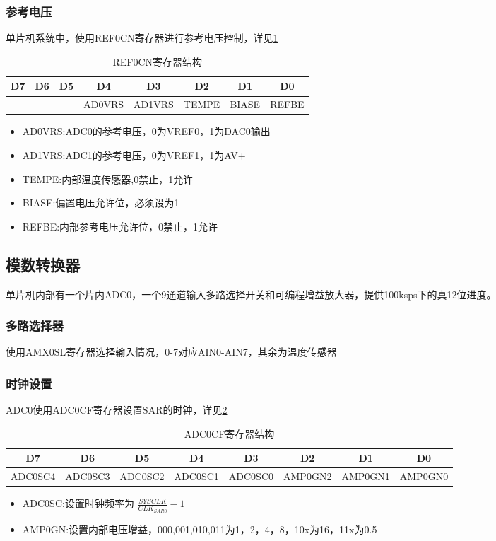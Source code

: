 \documentclass{article}
\begin{document}
\begin{CJK}{UTF8}{gkai}
\subsubsection{参考电压}
单片机系统中，使用REF0CN寄存器进行参考电压控制，详见\ref{table_REF0CN}
\begin{table}[!htbp]
  \caption{REF0CN寄存器结构}
  \label{table_REF0CN}
  \begin{tabular}{|c|c|c|c|c|c|c|c|}
    \hline
    D7&D6&D5&D4&D3&D2&D1&D0\\
		  \hline
    &&&AD0VRS&AD1VRS&TEMPE&BIASE&REFBE\\
		  \hline
    \hline
  \end{tabular}
\end{table}
\begin{itemize}
  \item AD0VRS:ADC0的参考电压，0为VREF0，1为DAC0输出
  \item AD1VRS:ADC1的参考电压，0为VREF1，1为AV+
  \item TEMPE:内部温度传感器,0禁止，1允许
  \item BIASE:偏置电压允许位，必须设为1
  \item REFBE:内部参考电压允许位，0禁止，1允许
\end{itemize}
\subsection{模数转换器}
单片机内部有一个片内ADC0，一个9通道输入多路选择开关和可编程增益放大器，提供100ksps下的真12位进度。
\subsubsection{多路选择器}
使用AMX0SL寄存器选择输入情况，0-7对应AIN0-AIN7，其余为温度传感器
\subsubsection{时钟设置}
ADC0使用ADC0CF寄存器设置SAR的时钟，详见\ref{table_ADC0CF}
\begin{table}[!htbp]
  \caption{ADC0CF寄存器结构}
  \label{table_ADC0CF}
  \begin{tabular}{|c|c|c|c|c|c|c|c|}
    \hline
    D7&D6&D5&D4&D3&D2&D1&D0\\
		  \hline
    ADC0SC4&ADC0SC3&ADC0SC2&ADC0SC1&ADC0SC0&AMP0GN2&AMP0GN1&AMP0GN0\\
		  \hline
    \hline
  \end{tabular}
\end{table}
\begin{itemize}
  \item ADC0SC:设置时钟频率为 $\frac{SYSCLK}{CLK_{SAR0}}-1$
  \item AMP0GN:设置内部电压增益，000,001,010,011为1，2，4，8，10x为16，11x为0.5
\end{itemize}

\end{CJK}
\end{document}
